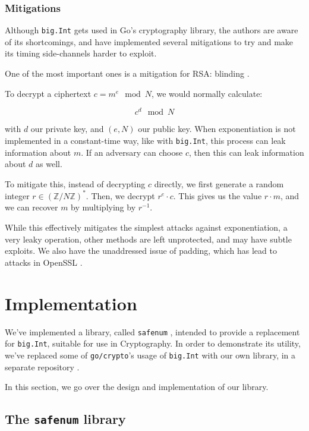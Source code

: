 \documentclass[11pt, a4paper]{article} %
\begin{document}
{\subsubsection{Mitigations}

Although \texttt{big.Int} gets used in Go's cryptography library,
the authors are aware of its shortcomings, and have implemented
several mitigations to try and make its timing side-channels harder to
exploit.

One of the most important ones is a mitigation
for RSA: blinding \cite{kocher_timing_1996}.

To decrypt a ciphertext
$c = m^e \mod N$, we would normally calculate:

$$
c^d \mod N
$$

with $d$ our private key, and $(e, N)$ our public key.
When exponentiation is not implemented in a constant-time way, like
with \texttt{big.Int}, this process can leak information about $m$.
If an adversary can choose $c$, then this can leak information about
$d$ as well.

To mitigate this, instead of decrypting $c$ directly,
we first generate a random integer
$r \in (\mathbb{Z}/N\mathbb{Z})^*$. Then, we decrypt $r^e \cdot c$.
This gives us the value $r \cdot m$, and we can recover
$m$ by multiplying by $r^{-1}$.

While this effectively mitigates the simplest attacks
against exponentiation, a very leaky operation,
other methods are left unprotected, and may
have subtle exploits. We also have
the unaddressed issue of padding, which has lead to attacks
in OpenSSL \cite{merget_raccoon_2019}.

\section{Implementation}

We've implemented a library, called
\texttt{safenum} \cite{meier_cronokirbysafenum_2021}, intended to provide
a replacement for \texttt{big.Int}, suitable for use in Cryptography.
In order to demonstrate its utility, we've replaced some
of \texttt{go/crypto}'s usage of \texttt{big.Int} with our own library,
in a separate repository
\cite{meier_cronokirbyctcrypto_2021}.

In this section, we go over the design and implementation of our
library.

\subsection{The \texttt{safenum} library}

}
\end{document}
